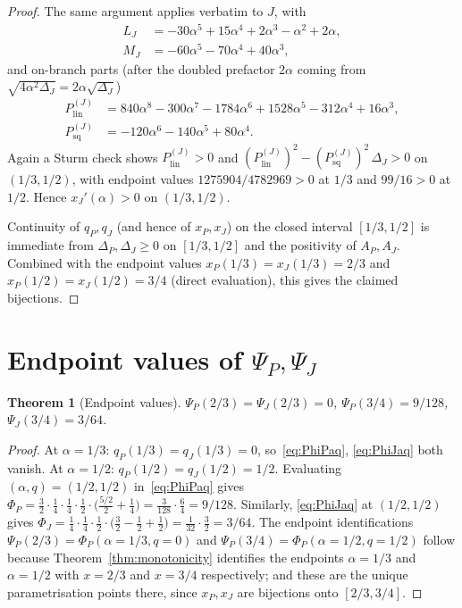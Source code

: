 \documentclass[11pt]{amsart}
\newtheorem{theorem}{Theorem}[section]
\theoremstyle{definition}
\begin{document}
\begin{proof}
The same argument applies verbatim to $J$, with
\begin{align*}
L_J &= -30\alpha^5+15\alpha^4+2\alpha^3-\alpha^2+2\alpha,
\\
M_J &= -60\alpha^5-70\alpha^4+40\alpha^3,
\end{align*}
and on-branch parts (after the doubled prefactor $2\alpha$ coming from
$\sqrt{4\alpha^2\Delta_J}=2\alpha\sqrt{\Delta_J}$)
\begin{align*}
P_{\mathrm{lin}}^{(J)} &= 840\alpha^8 - 300\alpha^7 - 1784\alpha^6 + 1528\alpha^5 - 312\alpha^4 + 16\alpha^3,
\\
P_{\mathrm{sq}}^{(J)}  &= -120\alpha^6 - 140\alpha^5 + 80\alpha^4.
\end{align*}
Again a Sturm check shows $P_{\mathrm{lin}}^{(J)} > 0$ and
$(P_{\mathrm{lin}}^{(J)})^2 - (P_{\mathrm{sq}}^{(J)})^2\,\Delta_J > 0$ on
$(1/3,1/2)$, with endpoint values $1275904/4782969 > 0$ at $1/3$ and $99/16 > 0$
at $1/2$.  Hence $x_J'(\alpha) > 0$ on $(1/3,1/2)$.

Continuity of $q_P,q_J$ (and hence of $x_P,x_J$) on the closed interval
$[1/3,1/2]$ is immediate from $\Delta_P,\Delta_J\ge 0$ on $[1/3,1/2]$ and the
positivity of $A_P,A_J$.  Combined with the endpoint values
$x_P(1/3)=x_J(1/3)=2/3$ and $x_P(1/2)=x_J(1/2)=3/4$ (direct evaluation), this
gives the claimed bijections.
\end{proof}

\section{Endpoint values of \texorpdfstring{$\Psi_P,\Psi_J$}{Psi\_P, Psi\_J}}
\label{sec:endpoints}

\begin{theorem}[Endpoint values]
\label{thm:endpoints}
$\Psi_P(2/3) = \Psi_J(2/3) = 0$, $\Psi_P(3/4) = 9/128$, $\Psi_J(3/4) = 3/64$.
\end{theorem}

\begin{proof}
At $\alpha=1/3$: $q_P(1/3) = q_J(1/3) = 0$, so~\eqref{eq:PhiPaq}, \eqref{eq:PhiJaq}
both vanish.  At $\alpha=1/2$: $q_P(1/2) = q_J(1/2) = 1/2$.  Evaluating
$(\alpha,q)=(1/2,1/2)$ in~\eqref{eq:PhiPaq} gives
\(
\Phi_P=\tfrac32\cdot\tfrac14\cdot\tfrac14\cdot\tfrac12\cdot
  \bigl(\tfrac{5/2}{2}+\tfrac14\bigr)
  =\tfrac{3}{128}\cdot\tfrac{6}{4}
  =9/128.
\)
Similarly, \eqref{eq:PhiJaq} at $(1/2,1/2)$ gives
\(
\Phi_J=\tfrac14\cdot\tfrac14\cdot\tfrac12\cdot
  \bigl(\tfrac32-\tfrac12+\tfrac12\bigr)
  =\tfrac{1}{32}\cdot\tfrac32=3/64.
\)
The endpoint identifications $\Psi_P(2/3)=\Phi_P(\alpha=1/3,q=0)$ and
$\Psi_P(3/4)=\Phi_P(\alpha=1/2,q=1/2)$ follow because Theorem~\ref{thm:monotonicity}
identifies the endpoints $\alpha=1/3$ and $\alpha=1/2$ with $x=2/3$ and $x=3/4$
respectively; and these are the unique parametrisation points there, since
$x_P,x_J$ are bijections onto $[2/3,3/4]$.
\end{proof}
\end{document}
